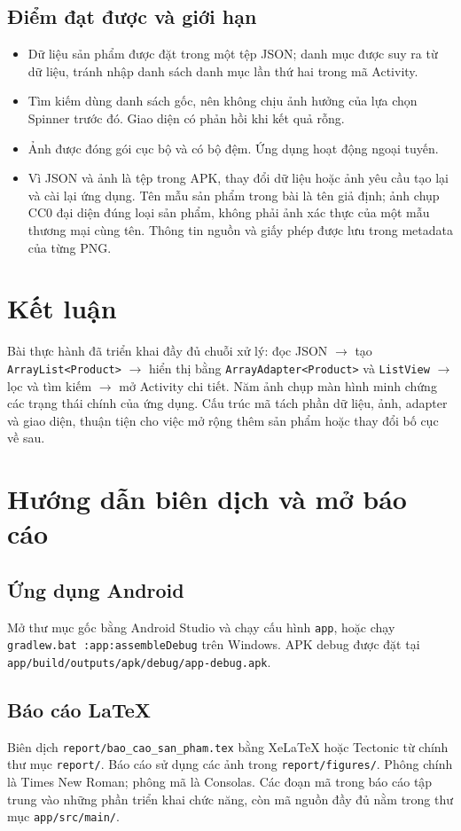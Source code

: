 \documentclass[12pt,a4paper]{article}
\newcommand{\codepath}[1]{\nolinkurl{#1}}
\begin{document}
\subsection{Điểm đạt được và giới hạn}
\begin{itemize}
\item Dữ liệu sản phẩm được đặt trong một tệp JSON; danh mục được suy ra từ dữ liệu,
tránh nhập danh sách danh mục lần thứ hai trong mã Activity.
\item Tìm kiếm dùng danh sách gốc, nên không chịu ảnh hưởng của lựa chọn Spinner trước đó.
Giao diện có phản hồi khi kết quả rỗng.
\item Ảnh được đóng gói cục bộ và có bộ đệm. Ứng dụng hoạt động ngoại tuyến.
\item Vì JSON và ảnh là tệp trong APK, thay đổi dữ liệu hoặc ảnh yêu cầu tạo lại và cài lại ứng dụng.
Tên mẫu sản phẩm trong bài là tên giả định; ảnh chụp CC0 đại diện đúng loại sản phẩm,
không phải ảnh xác thực của một mẫu thương mại cùng tên. Thông tin nguồn và giấy phép
được lưu trong metadata của từng PNG.
\end{itemize}

\section{Kết luận}
Bài thực hành đã triển khai đầy đủ chuỗi xử lý:
đọc JSON $\rightarrow$ tạo \texttt{ArrayList<Product>} $\rightarrow$
hiển thị bằng \texttt{ArrayAdapter<Product>} và \texttt{ListView} $\rightarrow$
lọc và tìm kiếm $\rightarrow$ mở Activity chi tiết.
Năm ảnh chụp màn hình minh chứng các trạng thái chính của ứng dụng.
Cấu trúc mã tách phần dữ liệu, ảnh, adapter và giao diện, thuận tiện cho việc
mở rộng thêm sản phẩm hoặc thay đổi bố cục về sau.

\appendix
\section{Hướng dẫn biên dịch và mở báo cáo}
\subsection{Ứng dụng Android}
Mở thư mục gốc bằng Android Studio và chạy cấu hình \texttt{app},
hoặc chạy \texttt{gradlew.bat :app:assembleDebug} trên Windows.
APK debug được đặt tại \codepath{app/build/outputs/apk/debug/app-debug.apk}.

\subsection{Báo cáo LaTeX}
Biên dịch \codepath{report/bao_cao_san_pham.tex} bằng XeLaTeX hoặc Tectonic
từ chính thư mục \codepath{report/}. Báo cáo sử dụng các ảnh trong
\codepath{report/figures/}. Phông chính là Times New Roman; phông mã là Consolas.
Các đoạn mã trong báo cáo tập trung vào những phần triển khai chức năng,
còn mã nguồn đầy đủ nằm trong thư mục \codepath{app/src/main/}.
\end{document}
